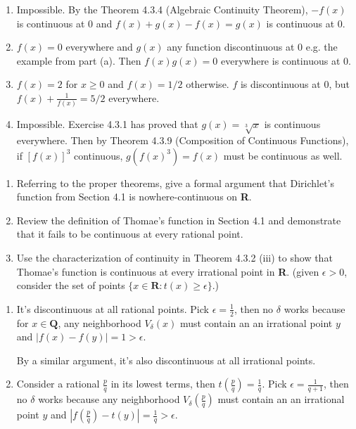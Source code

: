 \documentclass{oxmathproblems}
\begin{document}
\begin{questions}
\begin{solution}
\begin{enumerate}[label=(\alph*)]
    \item Impossible. By the Theorem 4.3.4 (Algebraic Continuity Theorem), $-f(x)$ is continuous at 0 and $f(x)+g(x) -f(x) = g(x)$ is continuous at 0.
    \item $f(x)=0$ everywhere and $g(x)$ any function discontinuous at $0$ e.g. the example from part (a). Then $f(x)g(x)=0$ everywhere is continuous at 0.
    \item $f(x)=2$ for $x \geq 0$ and $f(x)=1/2$ otherwise. $f$ is discontinuous at 0, but $f(x)+\frac{1}{f(x)}=5/2$ everywhere.
    \item Impossible. Exercise 4.3.1 has proved that $g(x)=\sqrt[3]{x}$ is continuous everywhere. Then by Theorem 4.3.9 (Composition of Continuous Functions),
    if $[f(x)]^3$ continuous, $g(f(x)^3)=f(x)$ must be continuous as well.
  \end{enumerate}
\end{solution}

\miquestion
\begin{enumerate}[label=(\alph*)]
  \item Referring to the proper theorems, give a formal argument that Dirichlet's function from Section 4.1 is nowhere-continuous on \textbf{R}.
  \item Review the definition of Thomae's function in Section 4.1 and demonstrate that it fails to be continuous at every rational point.
  \item Use the characterization of continuity in Theorem 4.3.2 (iii) to show that Thomae's function is continuous at every irrational point in \textbf{R}. (given
  $\epsilon > 0$, consider the set of points $\{x \in \textbf{R} : t(x) \geq \epsilon\}.$)
\end{enumerate}

\begin{solution}
  \begin{enumerate}[label=(\alph*)]
    \item It's discontinuous at all rational points. Pick $\epsilon = \frac{1}{2}$, then no $\delta$ works because for $x \in \textbf{Q}$, any neighborhood $V_{\delta}(x)$ must contain an
    an irrational point $y$ and $|f(x)-f(y)|=1 > \epsilon$.

    By a similar argument, it's also discontinuous at all irrational points.

    \item Consider a rational $\frac{p}{q}$ in its lowest terms, then $t(\frac{p}{q})=\frac{1}{q}$. Pick $\epsilon = \frac{1}{q+1}$, then no $\delta$ works because any neighborhood $V_{\delta}(\frac{p}{q})$
    must contain an an irrational point $y$ and $|f(\frac{p}{q})-t(y)|=\frac{1}{q} > \epsilon$.


\end{enumerate}
\end{solution}
\end{questions}
\end{document}
